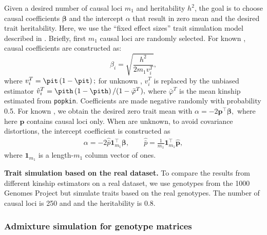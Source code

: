 \documentclass[11pt]{article}
\begin{document}
Given a desired number of causal loci $m_1$ and heritability $h^2$, the goal is to choose causal coefficients $\boldsymbol{\beta}$ and the intercept $\alpha$ that result in zero mean and the desired trait heritability.
Here, we use the ``fixed effect sizes'' trait simulation model described in \citep{yao_limitations_2022}.
Briefly, first $m_1$ causal loci are randomly selected.
For known \pit, causal coefficients are constructed as:
$$
\beta_i = \sqrt{ \frac{h^2}{ 2 m_1 v_i^T } },
$$
where
$
v_i^T
=
\pit \left( 1 - \pit \right)
;
$
for unknown \pit,  $v_i^T$ is replaced by the unbiased estimator
$
\hat{v}_i^T
=
\pith \left( 1 - \pith \right) / ( 1 - \bar{\varphi}^T )
,
$
where $\bar{\varphi}^T$ is the mean kinship estimated from \texttt{popkin}.
Coefficients are made negative randomly with probability 0.5.
For known \pit, we obtain the desired zero trait mean with
$
\alpha 
=
- 2 \mathbf{p}^\intercal \boldsymbol{\beta}
,
$
where here $\mathbf{p}$ contains causal loci only.
When \pit are unknown, to avoid covariance distortions, the intercept coefficient is constructed as
\begin{align*}
  \alpha 
  =
  - 2 \hat{\bar{p}} \mathbf{1}_{m_1}^\intercal \boldsymbol{\beta}
  , \quad\quad
  \hat{\bar{p}}
  =
  \frac{1}{m_1} \mathbf{1}_{m_1}^\intercal \mathbf{\hat{p}}
  ,
\end{align*}
where $\mathbf{1}_{m_1}$ is a length-$m_1$ column vector of ones.

\textbf{Trait simulation based on the real dataset.}
To compare the results from different kinship estimators on a real dataset, we use genotypes from the 1000 Genomes Project \citep{the_1000_genomes_project_consortium_map_2010, 1000_genomes_project_consortium_integrated_2012} but simulate traits based on the real genotypes. The number of causal loci is 250 and and the heritability is 0.8.

\subsubsection{Admixture simulation for genotype matrices}
\end{document}
